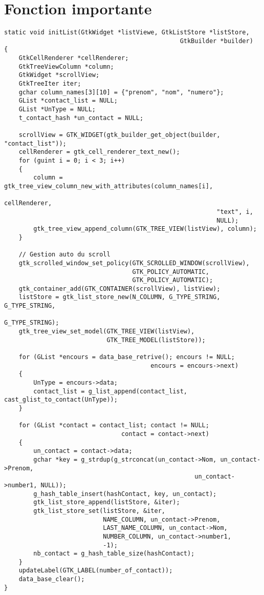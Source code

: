 \documentclass[a4paper, 11pt]{article}
\begin{document}
\section{Fonction importante}
\begin{verbatim}
static void initList(GtkWidget *listViewe, GtkListStore *listStore, 
												GtkBuilder *builder)
{
    GtkCellRenderer *cellRenderer;
    GtkTreeViewColumn *column;
    GtkWidget *scrollView;
    GtkTreeIter iter;
    gchar column_names[3][10] = {"prenom", "nom", "numero"};
    GList *contact_list = NULL;
    GList *UnType = NULL;
    t_contact_hash *un_contact = NULL;

    scrollView = GTK_WIDGET(gtk_builder_get_object(builder, "contact_list"));
    cellRenderer = gtk_cell_renderer_text_new();
    for (guint i = 0; i < 3; i++)
    {
        column = gtk_tree_view_column_new_with_attributes(column_names[i],
                                                          cellRenderer,
                                                          "text", i,
                                                          NULL);
        gtk_tree_view_append_column(GTK_TREE_VIEW(listView), column);
    }

    // Gestion auto du scroll
    gtk_scrolled_window_set_policy(GTK_SCROLLED_WINDOW(scrollView),
                                   GTK_POLICY_AUTOMATIC,
                                   GTK_POLICY_AUTOMATIC);
    gtk_container_add(GTK_CONTAINER(scrollView), listView);
    listStore = gtk_list_store_new(N_COLUMN, G_TYPE_STRING, G_TYPE_STRING, 
    														G_TYPE_STRING);
    gtk_tree_view_set_model(GTK_TREE_VIEW(listView),
                            GTK_TREE_MODEL(listStore));

    for (GList *encours = data_base_retrive(); encours != NULL; 
    									encours = encours->next)
    {
        UnType = encours->data;
        contact_list = g_list_append(contact_list, cast_glist_to_contact(UnType));
    }

    for (GList *contact = contact_list; contact != NULL; 
    							contact = contact->next)
    {
        un_contact = contact->data;
        gchar *key = g_strdup(g_strconcat(un_contact->Nom, un_contact->Prenom, 
        											un_contact->number1, NULL));
        g_hash_table_insert(hashContact, key, un_contact);
        gtk_list_store_append(listStore, &iter);
        gtk_list_store_set(listStore, &iter,
                           NAME_COLUMN, un_contact->Prenom,
                           LAST_NAME_COLUMN, un_contact->Nom,
                           NUMBER_COLUMN, un_contact->number1,
                           -1);
        nb_contact = g_hash_table_size(hashContact);
    }
    updateLabel(GTK_LABEL(number_of_contact));
    data_base_clear();
}
\end{verbatim}
\end{document}
